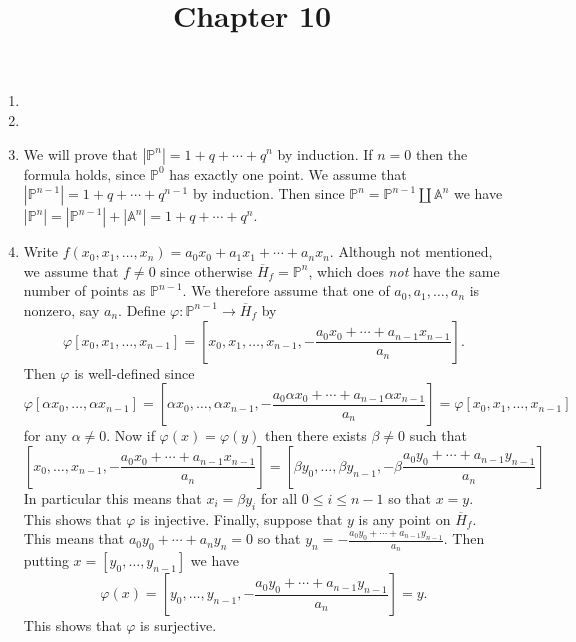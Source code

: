 \documentclass[12pt]{article}
\title{Chapter 10}
\author{}\date{}
\begin{document}
\maketitle

\begin{enumerate}
\item %

\item %
\item %
We will prove that $\left|\mathbb{P}^{n}\right|
=1+q+\cdots+q^n$ by induction.
If $n=0$ then the formula holds, since $\mathbb{P}^0$ has exactly
one point.
We assume that $\left|\mathbb{P}^{n-1}\right|
=1+q+\cdots+q^{n-1}$ by induction.
Then since $\mathbb{P}^n=\mathbb{P}^{n-1}\coprod\mathbb{A}^n$
we have $\left|\mathbb{P}^n\right|
=\left|\mathbb{P}^{n-1}\right|+\left|\mathbb{A}^n\right|
=1+q+\cdots+q^n$.

\item %
Write $f\left(x_0,x_1,\ldots,x_n\right)
=a_0x_0+a_1x_1+\cdots+a_nx_n$.
Although not mentioned, we assume that $f\ne 0$
since otherwise $\overline{H}_f=\mathbb{P}^n$,
which does {\em not} have the same number of points
as $\mathbb{P}^{n-1}$. We therefore assume that one of
$a_0,a_1,\ldots,a_n$ is nonzero, say $a_n$. Define
$\varphi:\mathbb{P}^{n-1}\to\overline{H}_f$ by
\[\varphi\left[x_0,x_1,\ldots,x_{n-1}\right]
=\left[x_0,x_1,\ldots,x_{n-1},-\frac{a_0x_0+\cdots+a_{n-1}x_{n-1}}{a_n}
\right].\]
Then $\varphi$ is well-defined since
\[\varphi\left[\alpha x_0,\ldots,\alpha x_{n-1}\right]
=\left[\alpha x_0,\ldots,\alpha x_{n-1},
-\frac{a_0\alpha x_0+\cdots+a_{n-1}\alpha x_{n-1}}{a_n}\right]
=\varphi\left[x_0,x_1,\ldots,x_{n-1}\right]\]
for any $\alpha\ne 0$.
Now if $\varphi\left(x\right)=\varphi\left(y\right)$
then there exists $\beta\ne 0$ such that
\[\left[x_0,\ldots,x_{n-1},-\frac{a_0x_0
+\cdots+a_{n-1}x_{n-1}}{a_n}\right]
=\left[\beta y_0,\ldots,\beta y_{n-1},-\beta\frac{a_0y_0
+\cdots+a_{n-1}y_{n-1}}{a_n}\right]\]
In particular this means that $x_i=\beta y_i$
for all $0\le i\le n-1$ so that $x=y$.
This shows that $\varphi$ is injective.
Finally, suppose that $y$ is any point on $\overline{H}_f$.
This means that $a_0y_0+\cdots+a_ny_n=0$
so that $y_n=-\frac{a_0y_0+\cdots+a_{n-1}y_{n-1}}{a_n}$.
Then putting $x=\left[y_0,\ldots,y_{n-1}\right]$ we have
\[\varphi\left(x\right)
=\left[y_0,\ldots,y_{n-1},-\frac{a_0y_0+\cdots+a_{n-1}y_{n-1}}{a_n}
\right]=y.\]
This shows that $\varphi$ is surjective.
\end{enumerate}
\end{document}
